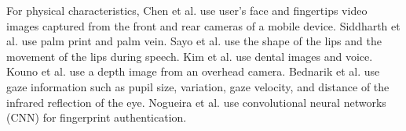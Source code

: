 \documentclass[sigchi,authordraft]{acmart}
\begin{document}
For physical characteristics, Chen et al.\cite{face_and_finger} use user's face and fingertips video images captured from the front and rear cameras of a mobile device. 
Siddharth et al.\cite{palm_print} use palm print and palm vein. %
Sayo et al.\cite{lip_motion} use the shape of the lips and the movement of the lips during speech. 
Kim et al.\cite{teeth_and_voice} use dental images and voice. 
Kouno et al.\cite{head_top_camera} use a depth image from an overhead camera. %
Bednarik et al.\cite{eye_movement} use gaze information such as pupil size, variation, gaze velocity, and distance of the infrared reflection of the eye. 
Nogueira et al.\cite{finger_CNN} use convolutional neural networks (CNN) for fingerprint authentication.
\end{document}
